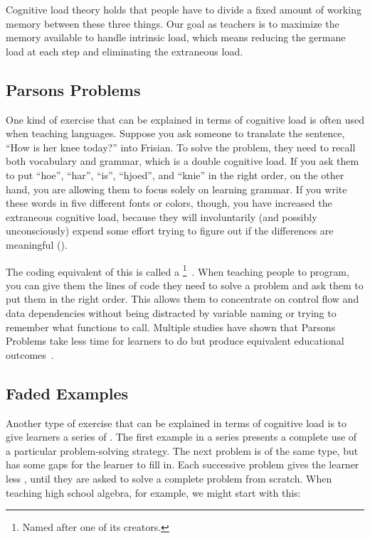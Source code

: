 Cognitive load theory holds that
people have to divide a fixed amount of working memory between these three things.
Our goal as teachers is to maximize the memory available to handle intrinsic load,
which means reducing the germane load at each step and eliminating the extraneous load.

\subsection*{Parsons Problems}

One kind of exercise that can be explained in terms of cognitive load
is often used when teaching languages.
Suppose you ask someone to translate the sentence, ``How is her knee today?'' into Frisian.
To solve the problem,
they need to recall both vocabulary and grammar,
which is a double cognitive load.
If you ask them to put ``hoe'', ``har'', ``is'', ``hjoed'', and ``knie'' in the right order,
on the other hand,
you are allowing them to focus solely on learning grammar.
If you write these words in five different fonts or colors,
though,
you have increased the extraneous cognitive load,
because they will involuntarily (and possibly unconsciously) expend some effort
trying to figure out if the differences are meaningful
().


The coding equivalent of this
is called a \footnote{Named after one of its creators.}~\cite{Pars2006}.
When teaching people to program,
you can give them the lines of code they need to solve a problem
and ask them to put them in the right order.
This allows them to concentrate on control flow and data dependencies
without being distracted by variable naming or trying to remember what functions to call.
Multiple studies have shown that Parsons Problems take less time for learners to do
but produce equivalent educational outcomes~\cite{Eric2017}.

\subsection*{Faded Examples}

Another type of exercise that can be explained in terms of cognitive load
is to give learners a series of .
The first example in a series presents a complete use of a particular problem-solving strategy.
The next problem is of the same type,
but has some gaps for the learner to fill in.
Each successive problem gives the learner less ,
until they are asked to solve a complete problem from scratch.
When teaching high school algebra,
for example,
we might start with this:

